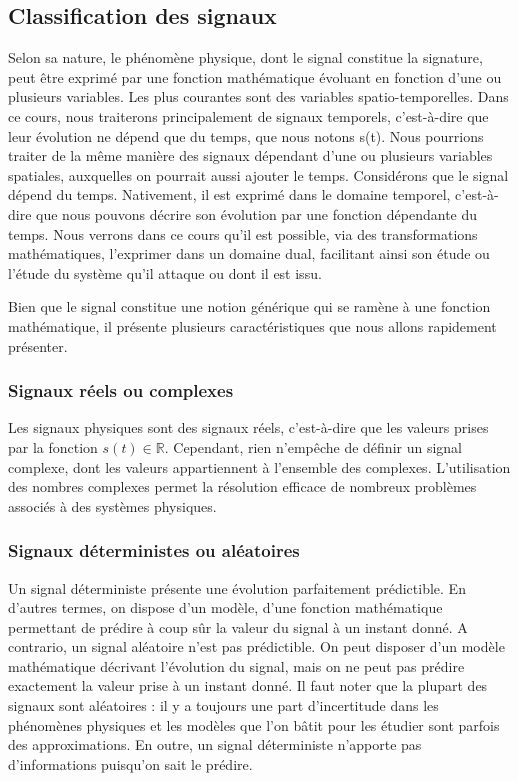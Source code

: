 	
	
	
	
	\subsection{Classification des signaux}
	
	Selon sa nature, le phénomène physique, dont le signal constitue la
	signature, peut être exprimé par une fonction mathématique évoluant en
	fonction d'une ou plusieurs variables. Les plus courantes sont des
	variables spatio-temporelles. Dans ce cours, nous traiterons
	principalement de signaux temporels, c'est-à-dire que leur évolution ne
	dépend que du temps, que nous notons s(t). Nous pourrions traiter de la même manière des
	signaux dépendant d'une ou plusieurs variables spatiales, auxquelles on
	pourrait aussi ajouter le temps.
	Considérons que le signal dépend du temps. Nativement, il est exprimé
	dans le domaine temporel, c'est-à-dire que nous pouvons décrire son
	évolution par une fonction dépendante du temps. Nous verrons dans ce
	cours qu'il est possible, via des transformations mathématiques,
	l'exprimer dans un domaine dual, facilitant ainsi son étude ou l'étude
	du système qu'il attaque ou dont il est issu.
	
	Bien que le signal constitue une notion générique qui se ramène à une fonction mathématique, il présente plusieurs caractéristiques que nous allons rapidement présenter.
	
	\subsubsection{Signaux réels ou complexes}
	

	Les signaux physiques sont des signaux réels, c'est-à-dire que les valeurs prises par la fonction $s(t) \in \mathbb{R}$. Cependant, rien n'empêche de définir un signal complexe, dont les valeurs appartiennent à l'ensemble des complexes. L'utilisation des nombres complexes permet la résolution efficace de nombreux problèmes associés à des systèmes physiques. 
	
	\subsubsection{Signaux déterministes ou aléatoires}
	Un signal déterministe présente une évolution parfaitement prédictible. En d'autres termes, on dispose d'un modèle, d'une fonction mathématique permettant de prédire à coup sûr la valeur du signal à un instant donné. A contrario, un signal aléatoire n'est pas prédictible. On peut disposer d'un modèle mathématique décrivant l'évolution du signal, mais on ne peut pas prédire exactement la valeur prise à un instant donné. Il faut noter que la plupart des signaux sont aléatoires : il y a toujours une part d'incertitude dans les phénomènes physiques et les modèles que l'on bâtit pour les étudier sont parfois des approximations. En outre, un signal déterministe n'apporte pas d'informations puisqu'on sait le prédire. 
		
